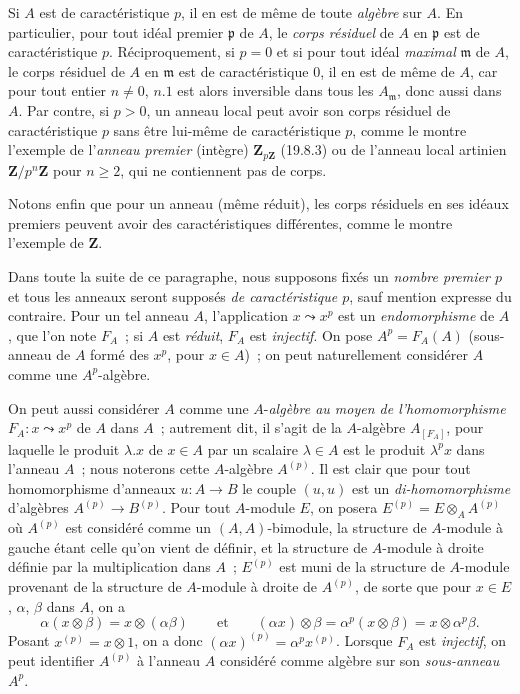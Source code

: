 \begin{env}[21.1.3]
\label{0.21.1.3-fr}
Si $A$ est de caractéristique $p$, il en est de même de toute \emph{algèbre} sur
$A$. En particulier, pour tout idéal premier $\mathfrak p$ de $A$, le \emph{corps
résiduel} de $A$ en $\mathfrak p$ est de caractéristique $p$. Réciproquement,
si $p=0$ et si pour tout idéal \emph{maximal} $\mathfrak m$ de $A$, le corps
résiduel de $A$ en $\mathfrak m$ est de caractéristique $0$, il en est de même
de $A$, car pour tout entier $n\neq0$, $n.1$ est alors inversible dans
tous les $A_{\mathfrak m}$, donc aussi dans $A$. Par contre, si $p>0$, un
anneau local peut avoir son corps résiduel de caractéristique $p$ sans être
lui-même de caractéristique $p$, comme le montre l'exemple de l'\emph{anneau
premier} (intègre) $\mathbf Z_{p\mathbf Z}$ (19.8.3) ou de l'anneau local artinien
$\mathbf Z/p^n\mathbf Z$ pour $n\geq2$, qui ne contiennent pas de corps.

Notons enfin que pour un anneau (même réduit), les corps résiduels en ses
idéaux premiers peuvent avoir des caractéristiques différentes, comme le
montre l'exemple de $\mathbf Z$.
\end{env}

\begin{env}[21.1.4]
\label{0.21.1.4-fr}
Dans toute la suite de ce paragraphe, nous supposons fixés un \emph{nombre premier
$p$} et tous les anneaux seront supposés \emph{de caractéristique $p$}, sauf mention
expresse du contraire. Pour un tel anneau $A$, l'application $x\leadsto x^p$
est un \emph{endomorphisme} de $A$, que l'on note $F_A$~; si $A$ est \emph{réduit}, $F_A$
est \emph{injectif}. On pose $A^p=F_A(A)$ (sous-anneau de $A$ formé des $x^p$,
pour $x\in A$)~; on peut naturellement considérer $A$ comme une $A^p$-algèbre.

On peut aussi considérer $A$ comme une $A$-\emph{algèbre au moyen de
l'homomorphisme} $F_A:x\leadsto x^p$ de $A$ dans $A$~; autrement dit, il
s'agit de la $A$-algèbre $A_{[F_A]}$, pour laquelle le produit $\lambda.x$ de
$x\in A$ par un scalaire $\lambda\in A$ est le produit $\lambda^p x$ dans
l'anneau $A$~; nous noterons cette $A$-algèbre $A^{(p)}$. Il est clair que pour tout homomorphisme d'anneaux $u:A\to B$
le couple $(u,u)$ est un \emph{di-homomorphisme} d'algèbres $A^{(p)}\to B^{(p)}$.
Pour tout $A$-module $E$, on posera $E^{(p)}=E\otimes_A A^{(p)}$ où
$A^{(p)}$ est considéré comme un $(A,A)$-bimodule, la structure de
$A$-module à gauche étant celle qu'on vient de définir, et la structure de
$A$-module à droite définie par la multiplication dans $A$~; $E^{(p)}$ est muni de la structure de $A$-module provenant de la structure de $A$-module à droite de $A^{(p)}$, de sorte que pour
$x\in E$, $\alpha$, $\beta$ dans $A$, on a
\[
  \alpha(x\otimes\beta)=x\otimes(\alpha\beta)\qquad\text{et}\qquad
  (\alpha x)\otimes\beta=\alpha^p(x\otimes\beta)=x\otimes\alpha^p\beta.
\]
Posant $x^{(p)}=x\otimes1$, on a donc $(\alpha x)^{(p)}=\alpha^p x^{(p)}$.
Lorsque $F_A$ est \emph{injectif}, on peut identifier $A^{(p)}$ à l'anneau $A$
considéré comme algèbre sur son \emph{sous-anneau} $A^p$.
\end{env}

